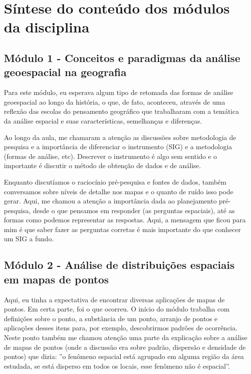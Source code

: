 \section{Síntese do conteúdo dos módulos da disciplina}

\subsection{Módulo 1 - Conceitos e paradigmas da análise geoespacial na geografia}

Para este módulo, eu esperava algum tipo de retomada das formas de análise geoespacial ao longo da história, o que, de fato, aconteceu, através de uma reflexão das escolas do pensamento geográfico que trabalharam com a temática da análise espacial e suas características, semelhanças e diferenças. 

Ao longo da aula, me chamaram a atenção as discussões sobre metodologia de pesquisa e a importância de diferenciar o instrumento (SIG) e a metodologia (formas de análise, etc). Descrever o instrumento é algo sem sentido e o importante é discutir o método de obtenção de dados e de análise. 

Enquanto discutíamos o raciocínio pré-pesquisa e fontes de dados, também conversamos sobre níveis de detalhe nos mapas e o quanto de ruído isso pode gerar. Aqui, me chamou a atenção a importância dada ao planejamento pré-pesquisa, desde o que pensamos em responder (as perguntas espaciais), até as formas como podemos representar as respostas. Aqui, a mensagem que ficou para mim é que saber fazer as perguntas corretas é mais importante do que conhecer um SIG a fundo.

\subsection{Módulo 2 - Análise de distribuições espaciais em mapas de pontos}

Aqui, eu tinha a expectativa de encontrar diversas aplicações de mapas de pontos. Em certa parte, foi o que ocorreu. O início do módulo trabalha com definições sobre o ponto, a substância de um ponto, arranjo de pontos e aplicações desses itens para, por exemplo, descobrirmos padrões de ocorrência. Neste ponto também me chamou atenção uma parte da explicação sobre a análise de mapas de pontos (onde a discussão era sobre padrão, dispersão e densidade de pontos) que dizia: ''o fenômeno espacial está agrupado em alguma região da área estudada, se está disperso em todos os locais, esse fenômeno não é espacial''.

